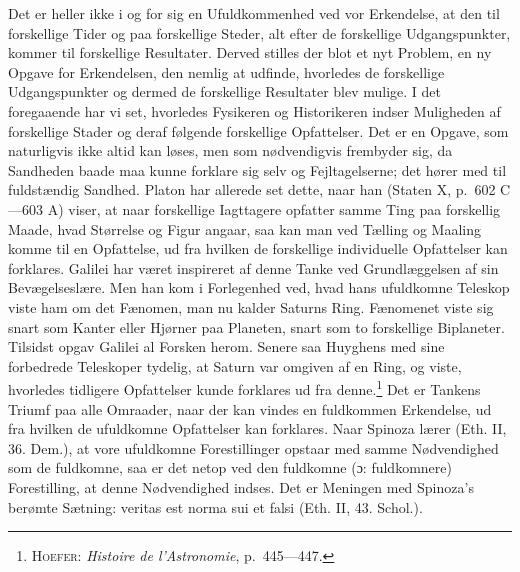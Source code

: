 \documentclass[12pt]{article}
\newcommand{\opage}[1]{\marginnote{\footnotesize\textit{[#1]}}}
\begin{document}
Det er heller ikke i og for sig en Ufuldkommenhed ved vor Erkendelse, at
den til forskellige Tider og paa forskellige Steder, alt efter de
forskellige Udgangspunkter, kommer til forskellige Resultater. Derved
stilles der blot et nyt Problem, en ny Opgave for Erkendelsen, den nemlig
at udfinde, hvorledes de forskellige Udgangspunkter og dermed de
forskellige Resultater blev mulige. I det foregaaende har vi set, hvorledes
Fysikeren og Historikeren indser Muligheden af forskellige Stader og deraf
følgende forskellige Opfattelser. Det er en Opgave, som naturligvis ikke
altid kan løses, men som nødvendigvis frembyder sig, da Sandheden baade maa
kunne forklare sig selv og Fejltagelserne; det hører med til fuldstændig
Sandhed. Platon har allerede set dette, naar han (Staten X, p.~602
C---603 A) viser, at naar forskellige Iagttagere opfatter samme Ting paa
forskellig Maade, hvad Størrelse og Figur angaar, saa kan man ved Tælling
og Maaling komme til en Opfattelse, ud fra hvilken de forskellige
individuelle Opfattelser kan forklares. Galilei har været inspireret af
denne Tanke ved
\opage{103} \setcounter{footnote}{0}
Grundlæggelsen af sin Bevægelseslære. Men han kom i Forlegenhed ved, hvad
hans ufuldkomne Teleskop viste ham om det Fænomen, man nu kalder Saturns
Ring. Fænomenet viste sig snart som Kanter eller Hjørner paa Planeten,
snart som to forskellige Biplaneter. Tilsidst opgav Galilei al Forsken
herom. Senere saa Huyghens med sine forbedrede Teleskoper tydelig, at
Saturn var omgiven af en Ring, og viste, hvorledes tidligere Opfattelser
kunde forklares ud fra denne.\footnote{\textsc{Hoefer}: \textit{Histoire de
l'Astronomie}, p.~445---447.} Det er Tankens Triumf paa alle Omraader, naar
der kan vindes en \guillemotright fuldkommen\guillemotleft{} Erkendelse, ud
fra hvilken de \guillemotright ufuldkomne\guillemotleft{} Opfattelser kan
forklares. Naar Spinoza lærer (Eth. II, 36. Dem.), at vore
\guillemotright ufuldkomne\guillemotleft{} Forestillinger opstaar med samme
Nødvendighed som de \guillemotright fuldkomne\guillemotleft, saa er det
netop ved den \guillemotright fuldkomne\guillemotleft{} (ɔ: fuldkomnere)
Forestilling, at denne Nødvendighed indses. Det er Meningen med Spinoza's
berømte Sætning: veritas est norma sui et falsi (Eth. II, 43. Schol.).
\end{document}
